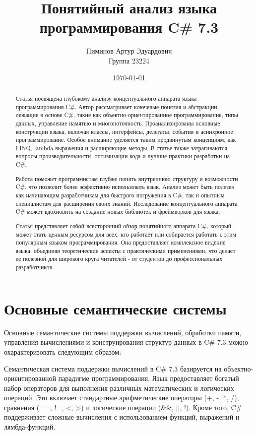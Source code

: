 \documentclass[a4paper, 12pt]{article}
\title{Понятийный анализ языка программирования C\# 7.3}
\author{Пиминов Артур Эдуардович\\Группа 23224}
\date{\today}
\begin{document}
\maketitle

\begin{abstract} 
Статья посвящена глубокому анализу концептуального аппарата языка программирования C\#. Автор рассматривает ключевые понятия и абстракции, лежащие в основе C\#, такие как объектно-ориентированное программирование, типы данных, управление памятью и многопоточность. Проанализированы основные конструкции языка, включая классы, интерфейсы, делегаты, события и асинхронное программирование. Особое внимание уделяется таким продвинутым концепциям, как LINQ, lambda-выражения и расширяющие методы. В статье также затрагиваются вопросы производительности, оптимизации кода и лучшие практики разработки на C\#.

Работа поможет программистам глубже понять внутреннюю структуру и возможности C\#, что позволит более эффективно использовать язык. Анализ может быть полезен как начинающим разработчикам для быстрого погружения в C\#, так и опытным специалистам для расширения своих знаний. Исследование концептуального аппарата C\# может вдохновить на создание новых библиотек и фреймворков для языка.

Статья представляет собой всесторонний обзор понятийного аппарата C\#, который может стать ценным ресурсом для всех, кто работает или собирается работать с этим популярным языком программирования. Она предоставляет комплексное видение языка, объединяя теоретические аспекты с практическими применениями, что делает ее полезной для широкого круга читателей - от студентов до профессиональных разработчиков \cite{csharp_semantic_analysis}. 
\end{abstract}

\section{Основные семантические системы} 
Основные семантические системы поддержки вычислений, обработки памяти, управления вычислениями и конструирования структур данных в C\# 7.3 можно охарактеризовать следующим образом:

Семантическая система поддержки вычислений в C\# 7.3 базируется на объектно-ориентированной парадигме программирования. Язык предоставляет богатый набор операторов для выполнения различных математических и логических операций. Это включает стандартные арифметические операторы (+, -, *, /), сравнения (==, !=, <, >) и логические операции (\&\&, ||, !). Кроме того, C\# поддерживает сложные вычисления с использованием функций, выражений и лямбда-функций.
\end{document}
